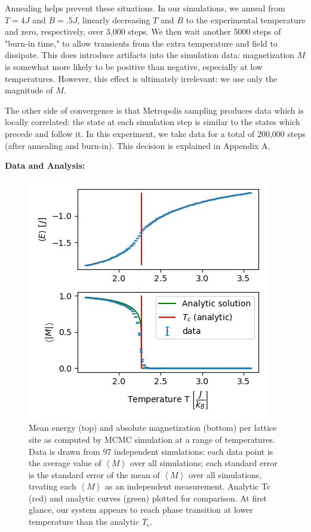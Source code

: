 \documentclass[letter,scriptaddress,twocolumn, prl]{revtex4}
\begin{document}
Annealing helps prevent these situations. In our simulations, we anneal from $T = 4 J$ and $B = .5 J$, linearly decreasing $T$ and $B$ to the experimental temperature and zero, respectively, over 3,000 steps. We then wait another 5000 steps of "burn-in time," to allow transients from the extra temperature and field to dissipate. This does introduce artifacts into the simulation data: magnetization $M$ is somewhat more likely to be positive than negative, especially at low temperatures. However, this effect is ultimately irrelevant: we use only the magnitude of $M$.

The other side of convergence is that Metropolis sampling produces data which is locally correlated: the state at each simulation step is similar to the states which precede and follow it. In this experiment, we take data for a total of 200,000 steps (after annealing and burn-in). This decision is explained in Appendix A.

\textbf{Data and Analysis:}

\begin{figure}[h]
	\begin{center}
		\includegraphics[width=.5\textwidth]{figs/fig2_EMplots.png}
		\caption{Mean energy (top) and absolute magnetization (bottom) per lattice site as computed by MCMC simulation at a range of temperatures. Data is drawn from 97 independent simulations: each data point is the average value of $\left\langle M \right\rangle$ over all simulations; each standard error is the standard error of the mean of $\left\langle M \right\rangle$ over all simulations, treating each $\left\langle M \right\rangle$ as an independent measurement. Analytic Tc (red) and analytic curves (green) plotted for comparison. At first glance, our system appears to reach phase transition at lower temperature than the analytic $T_c$.}
		\label{fig:fig2}
	\end{center}
\end{figure}
\end{document}
